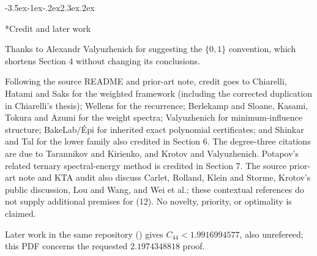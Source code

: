 \documentclass[11pt]{article}
\makeatletter
\renewcommand\section{\@startsection{section}{1}{\z@}
  {-3.5ex\@plus -1ex\@minus -.2ex}{2.3ex\@plus .2ex}
  {\normalfont\Large\bfseries\raggedright}}
\theoremstyle{remark}
\theoremstyle{correctionstyle}
\makeatother
\begin{document}
\section*{Credit and later work}
\label{credit}
Thanks to Alexandr Valyuzhenich for suggesting the $\{0,1\}$ convention,
which shortens Section 4 without changing its conclusions.

Following the source README and prior-art note, credit goes to Chiarelli,
Hatami and Saks for the weighted framework (including the corrected
duplication in Chiarelli's thesis); Wellens for the recurrence; Berlekamp
and Sloane, Kasami, Tokura and Azumi for the weight spectra; Valyuzhenich
for minimum-influence structure; BakeLab/Épi for inherited exact
polynomial certificates; and Shinkar and Tal for the lower family also
credited in Section 6. The degree-three citations are due to Tarannikov
and Kirienko, and Krotov and Valyuzhenich. Potapov's related ternary
spectral-energy method is credited in Section 7. The source prior-art
note and KTA audit also discuss Carlet, Rolland, Klein and Storme, Krotov's
public discussion, Lou and Wang, and Wei et al.; these contextual
references do not supply additional premises for (12). No novelty,
priority, or optimality is claimed.

Later work in the same repository ()
gives $C_{44}<1.9916994577$, also unrefereed; this PDF concerns the requested
$2.1974348818$ proof.
\end{document}
